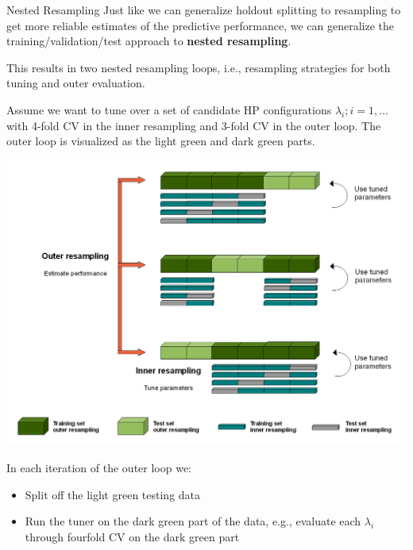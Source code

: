    \begin{frame}[c,allowframebreaks]{Nested Resampling}
    Just like we can generalize holdout splitting to resampling to get more reliable estimates of the predictive performance, we can generalize the training/validation/test approach to \textbf{nested resampling}.

    \bigskip

    This results in two nested resampling loops, i.e., resampling strategies for both tuning and outer evaluation.

    \framebreak

    Assume we want to tune over a set of candidate HP configurations $\lambda_i; i = 1, \dots$ with 4-fold CV in the inner resampling and 3-fold CV in the outer loop. The outer loop is visualized as the light green and dark green parts.

    \begin{center}
        \includegraphics[height=0.6\textheight]{Nested_Resampling.png}
    \end{center}

    \framebreak

    \begin{footnotesize}
    In each iteration of the outer loop we:
    \begin{itemize}
    \item Split off the light green testing data
    \item Run the tuner on the dark green part of the data, e.g.,
      evaluate each $\lambda_i$ through fourfold CV on the dark green part
    \end{itemize}
    \end{footnotesize}


\end{frame}
